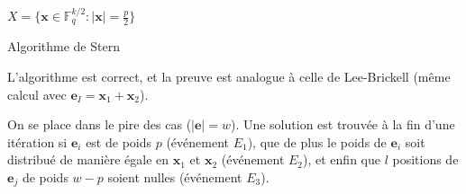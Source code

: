\documentclass{scrartcl}[a4paper,10pt,headings=small,footinclude=false]
\theoremstyle{definition}
\theoremstyle{remark}
\begin{document}
\begin{algorithm}[H]
    \renewcommand{\algorithmcfname}{Algorithme}%
    \SetAlgoLined
    $X=\{ \textbf{x}\in\mathbb{F}_q^{k/2} :|\textbf{x}| =\frac{p}{2} \}$
    
\caption{Algorithme de Stern}
\end{algorithm}

L'algorithme est correct, et la preuve est analogue à celle de Lee-Brickell (même calcul avec $\textbf{e}_I=\textbf{x}_1+\textbf{x}_2$).

On se place dans le pire des cas ($|\textbf{e}|=w$).
Une solution est trouvée à la fin d'une itération si $\textbf{e}_i$ est de poids $p$ (événement $E_1$), que de plus le poids de $\textbf{e}_i$ soit distribué de manière égale en $\textbf{x}_1$ et $\textbf{x}_2$ (événement $E_2$), et enfin que $l$ positions de $\textbf{e}_j$ de poids $w-p$ soient nulles (événement $E_3$).
\end{document}
